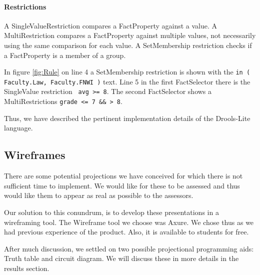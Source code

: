 \paragraph{Restrictions}
A SingleValueRestriction compares a FactProperty against a value.
A MultiRestriction compares a FactProperty against multiple values, not necessarily using the same comparison for each value.
A SetMembership restriction checks if a FactProperty is a member of a group.

In figure \ref{fig:Rule} on line 4 a SetMembership restriction is shown with the \texttt{in ( Faculty.Law, Faculty.FNWI )} text.
Line 5 in the first FactSelector there is the SingleValue restriction \texttt{ avg >= 8}.
The second FactSelector shows a MultiRestrictions \texttt{grade <= 7 \&\& > 8}.

Thus, we have described the pertinent implementation details of the Drools-Lite language.

\subsection{Wireframes}

There are some potential projections we have conceived for which there is not sufficient time to implement.
We would like for these to be assessed and thus would like them to appear as real as possible to the assessors.

Our solution to this conundrum, is to develop these presentations in a wireframing tool.
The Wireframe tool we choose was Axure\cite{Axure_ProductPage}.
We chose thus as we had previous experience of the product.
Also, it is available to students for free.

After much discussion, we settled on two possible projectional programming aids: Truth table and circuit diagram.
We will discuss these in more details in the results section.
